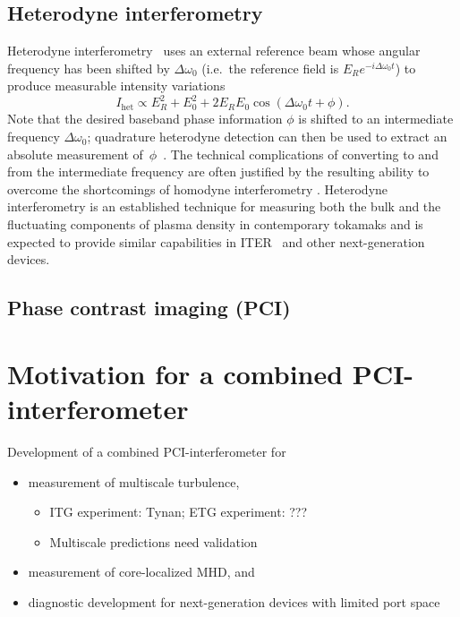\subsection{Heterodyne interferometry}
Heterodyne interferometry~\cite{hutchinson_diagnostics}
uses an external reference beam
whose angular frequency has been shifted by $\Delta \omega_0$
(i.e.\ the reference field is $E_R e^{-i \Delta \omega_0 t}$)
to produce measurable intensity variations
\begin{equation}
  I_{\text{het}}
  \propto
  E_R^2 + E_0^2 + 2 E_R E_0 \cos \left(\Delta \omega_0 t + \phi \right).
  \label{eq:OpticalInterferometry:Heterodyne:intensity}
\end{equation}
Note that the desired baseband phase information $\phi$ is shifted
to an intermediate frequency $\Delta \omega_0$;
quadrature heterodyne detection can then be used
to extract an absolute measurement of~$\phi$~\cite{carlstrom_rsi88}.
The technical complications of converting to and from
the intermediate frequency
are often justified by the resulting ability
to overcome the shortcomings of homodyne interferometry
\cite{hutchinson_diagnostics, nazikian_rsi87}.
Heterodyne interferometry is an established technique
for measuring both the bulk and the fluctuating components of plasma density
in contemporary tokamaks
\cite{carlstrom_rsi88, vanzeeland_ppcf05, mlynek_fst12, kasten_rsi12}
and is expected to provide similar capabilities
in ITER~\cite{vanzeeland_TIP_rsi13} and other next-generation devices.


\subsection{Phase contrast imaging (PCI)}


\section{Motivation for a combined PCI-interferometer}
Development of a combined PCI-interferometer for
\begin{itemize}
  \item measurement of multiscale turbulence,
    \begin{itemize}
      \item ITG experiment: Tynan; ETG experiment: ???
      \item Multiscale predictions need validation
    \end{itemize}
  \item measurement of core-localized MHD, and
  \item diagnostic development for next-generation devices
    with limited port space
\end{itemize}


